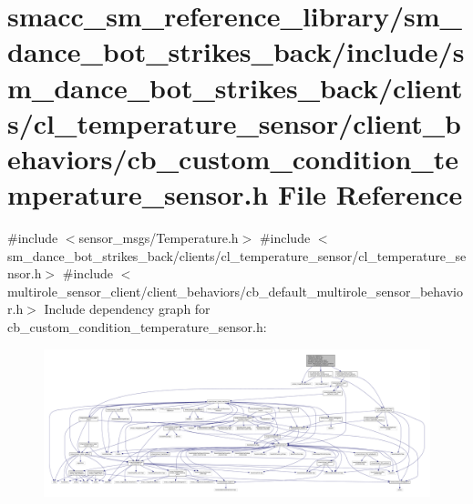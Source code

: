 \hypertarget{strikes__back_2include_2sm__dance__bot__strikes__back_2clients_2cl__temperature__sensor_2client_eb3f092c103b572cfc308a919200832c}{}\section{smacc\+\_\+sm\+\_\+reference\+\_\+library/sm\+\_\+dance\+\_\+bot\+\_\+strikes\+\_\+back/include/sm\+\_\+dance\+\_\+bot\+\_\+strikes\+\_\+back/clients/cl\+\_\+temperature\+\_\+sensor/client\+\_\+behaviors/cb\+\_\+custom\+\_\+condition\+\_\+temperature\+\_\+sensor.h File Reference}
\label{strikes__back_2include_2sm__dance__bot__strikes__back_2clients_2cl__temperature__sensor_2client_eb3f092c103b572cfc308a919200832c}
{\ttfamily \#include $<$sensor\+\_\+msgs/\+Temperature.\+h$>$}\newline
{\ttfamily \#include $<$sm\+\_\+dance\+\_\+bot\+\_\+strikes\+\_\+back/clients/cl\+\_\+temperature\+\_\+sensor/cl\+\_\+temperature\+\_\+sensor.\+h$>$}\newline
{\ttfamily \#include $<$multirole\+\_\+sensor\+\_\+client/client\+\_\+behaviors/cb\+\_\+default\+\_\+multirole\+\_\+sensor\+\_\+behavior.\+h$>$}\newline
Include dependency graph for cb\+\_\+custom\+\_\+condition\+\_\+temperature\+\_\+sensor.\+h\+:
\nopagebreak
\begin{figure}[H]
\begin{center}
\leavevmode
\includegraphics[width=350pt]{strikes__back_2include_2sm__dance__bot__strikes__back_2clients_2cl__temperature__sensor_2client_2d011142b926359dee04285f9195b9af}
\end{center}
\end{figure}
